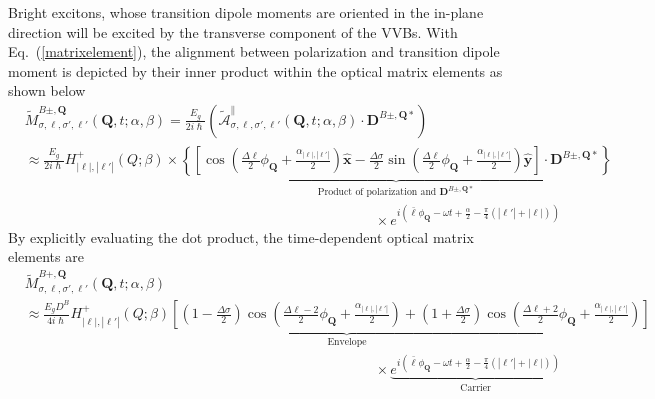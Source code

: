 Bright excitons, whose transition dipole moments are oriented in the in-plane direction will be excited by the transverse component of the VVBs. With Eq.~(\ref{matrixelement}), the alignment between polarization and transition dipole moment is depicted by their inner product within the optical matrix elements as shown below
\begin{equation}
\begin{aligned}
&\tilde{M}_{\sigma,\ell,\sigma',\ell'}^{B\pm,\boldsymbol{Q}}(\boldsymbol{Q}, t; \alpha, \beta) 
= \frac{E_g}{2i\hslash} \left( \widetilde{\boldsymbol{\mathcal{A}}}_{\sigma,\ell,\sigma',\ell'}^{\|}(\boldsymbol{Q}, t; \alpha, \beta) \cdot \boldsymbol{D}^{B\pm,\boldsymbol{Q}*} \right) \\[12pt]
&\approx \frac{E_g}{2i\hslash} H_{|\ell|,|\ell'|}^{+}(Q; \beta) \times \underbrace{\left\{ \left[ \cos\left( \frac{\Delta\ell}{2} \phi_{\boldsymbol{Q}} + \frac{\alpha_{|\ell|,|\ell'|}}{2} \right)\widehat{\boldsymbol{x}} - \frac{\Delta\sigma}{2} \sin\left( \frac{\Delta\ell}{2} \phi_{\boldsymbol{Q}} + \frac{\alpha_{|\ell|,|\ell'|}}{2} \right)\widehat{\boldsymbol{y}} \right] \cdot \boldsymbol{D}^{B\pm,\boldsymbol{Q}*} \right\}}_{\text{Product of polarization and } \boldsymbol{D}^{B\pm,\boldsymbol{Q}*}} \\[7pt]
& \hspace{25em} \times e^{i\left( \bar{\ell}\phi_{\boldsymbol{Q}} - \omega t + \frac{\alpha}{2} - \frac{\pi}{4} (|\ell'| + |\ell|) \right)}
\end{aligned}
\end{equation}
By explicitly evaluating the dot product, the time-dependent optical matrix elements are
\begin{equation}
\begin{aligned}
&\tilde{M}_{\sigma,\ell,\sigma',\ell'}^{B+,\boldsymbol{Q}}(\boldsymbol{Q}, t; \alpha, \beta) \\
& \approx \underbrace{\frac{E_g D^B}{4i\hslash} H_{|\ell|,|\ell'|}^{+}(Q; \beta) \left[ \left(1 - \tfrac{\Delta\sigma}{2}\right) \cos\left( \tfrac{\Delta\ell - 2}{2}\phi_{\boldsymbol{Q}} + \tfrac{\alpha_{|\ell|,|\ell'|}}{2} \right) + \left(1 + \tfrac{\Delta\sigma}{2}\right) \cos\left( \tfrac{\Delta\ell + 2}{2}\phi_{\boldsymbol{Q}} + \tfrac{\alpha_{|\ell|,|\ell'|}}{2} \right) \right]}_{\text{Envelope}} \\
&\hspace{25em} \times \underbrace{e^{i\left( \bar{\ell}\phi_{\boldsymbol{Q}} - \omega t + \tfrac{\alpha}{2} - \tfrac{\pi}{4} (|\ell'| + |\ell|) \right)}}_{\text{Carrier}}
\end{aligned}
\label{eq:matrixelement_upper_BX}
\end{equation}

